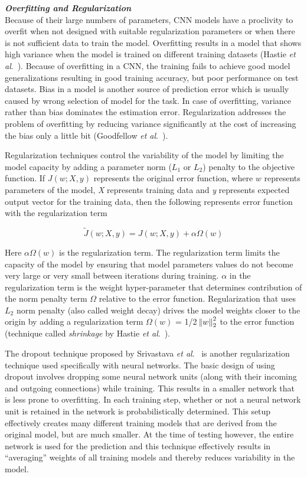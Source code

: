 \documentclass [11pt,letterpaper ,openany ]{report}
\begin{document}
    \noindent
    \textbf{\textit{Overfitting and Regularization}}\\    
    Because of their large numbers of parameters, CNN models have a proclivity to overfit when not designed with suitable regularization parameters or when there is not sufficient data to train the model. Overfitting results in a model that shows high variance when the model is trained on different training datasets (Hastie \textit{et al}.\ \cite{hastie-et-al-2014}). Because of overfitting in a CNN, the training fails to achieve good model generalizations resulting in good training accuracy, but poor performance on test datasets. Bias in a model is another source of prediction error which is usually caused by wrong selection of model for the task. In case of overfitting, variance rather than bias dominates the estimation error. Regularization addresses the problem of overfitting by reducing variance significantly at the cost of increasing the bias only a little bit (Goodfellow \textit{et al}.\ \cite{Goodfellow-et-al-2016}). 

    Regularization techniques control the variability of the model by limiting the model capacity by adding a parameter norm (\(L_1\) or \(L_2\)) penalty to the objective function. If \(J(w; X, y) \) represents the original error function, where \(w\) represents parameters of the model, \textit{X} represents training data and \textit{y} represents expected output vector for the training data, then the following represents error function with the regularization term

    \[ \widetilde{J}(w; X, y) = J(w; X, y) + \alpha \Omega(w)   \]

    \noindent
    Here \(\alpha \Omega(w)\) is the regularization term. The regularization term limits the capacity of the model by ensuring that model parameters values do not become very large or very small between iterations during training. \(\alpha\) in the regularization term is the weight hyper-parameter that determines contribution of the norm penalty term \(\Omega\) relative to the error function. Regularization that uses \(L_2\) norm penalty (also called weight decay) drives the model weights closer to the origin by adding a regularization term \( \Omega(w)\) = 1/2 \( \norm{w}^{2}_{2}  \) to the error function (technique called \textit{shrinkage} by Hastie \textit{et al}.\ \cite{hastie-et-al-2014}). 

    The dropout technique proposed by Srivastava \textit{et al}.\ \cite{srivastava2014dropout} is another regularization technique used specifically with neural networks. The basic design of using dropout involves dropping some neural network units (along with their incoming and outgoing connections) while training. This results in a smaller network that is less prone to overfitting. In each training step, whether or not a neural network unit is retained in the network is probabilistically determined. This setup effectively creates many different training models that are derived from the original model, but are much smaller. At the time of testing however, the entire network is used for the prediction and this technique effectively results in ``averaging'' weights of all training models and thereby reduces variability in the model.
\end{document}
